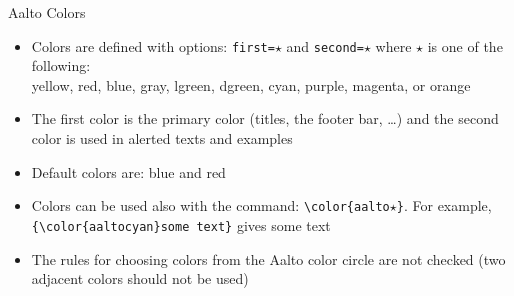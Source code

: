 \documentclass[first=red,second=purple,logo=yellowexc]{aaltoslides}
\begin{document}
\begin{frame}{Aalto Colors}

\begin{itemize}

\item Colors are defined with options: \texttt{first=$\star$} and \texttt{second=$\star$} where $\star$ is one of the following:\\
{\color{aaltoyellow}yellow}, 
{\color{aaltored}red}, 
{\color{aaltoblue}blue}, 
{\color{aaltogray}gray}, 
{\color{aaltolgreen}lgreen}, 
{\color{aaltodgreen}dgreen}, 
{\color{aaltocyan}cyan}, 
{\color{aaltopurple}purple}, 
{\color{aaltomagenta}magenta}, or
{\color{aaltoorange}orange}

\item The first color is the primary color (titles, the footer bar, \ldots) and the second color is used in alerted texts and examples

\item Default colors are: {\color{aaltoblue}blue} and {\color{aaltored}red}

\item Colors can be used also with the command: \texttt{\textbackslash color\{aalto}$\star$\texttt{\}}. For example, 
\texttt{\{\textbackslash color\{aaltocyan\}some text\}} 
gives {\color{aaltocyan}some text}

\item The rules for choosing colors from the Aalto color circle are not checked (two adjacent colors should not be used)

\end{itemize}

\end{frame}

\end{document}
